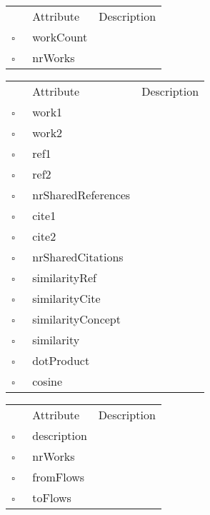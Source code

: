 \begin{table}
\caption{ScopusCountry  }

\begin{longtable}{llp{8cm}}
& Attribute & Description \\
$\square$\ & workCount &  \\
$\square$\ & nrWorks &  \\
\end{longtable}
\label{attr:ScopusCountry}
\end{table}

\begin{table}
\caption{Similarity  }

\begin{longtable}{llp{8cm}}
& Attribute & Description \\
$\square$\ & work1 &  \\
$\square$\ & work2 &  \\
$\square$\ & ref1 &  \\
$\square$\ & ref2 &  \\
$\square$\ & nrSharedReferences &  \\
$\square$\ & cite1 &  \\
$\square$\ & cite2 &  \\
$\square$\ & nrSharedCitations &  \\
$\square$\ & similarityRef &  \\
$\square$\ & similarityCite &  \\
$\square$\ & similarityConcept &  \\
$\square$\ & similarity &  \\
$\square$\ & dotProduct &  \\
$\square$\ & cosine &  \\
\end{longtable}
\label{attr:Similarity}
\end{table}

\begin{table}
\caption{SourceGroup  }

\begin{longtable}{llp{8cm}}
& Attribute & Description \\
$\square$\ & description &  \\
$\square$\ & nrWorks &  \\
$\square$\ & fromFlows &  \\
$\square$\ & toFlows &  \\
\end{longtable}
\label{attr:SourceGroup}
\end{table}

